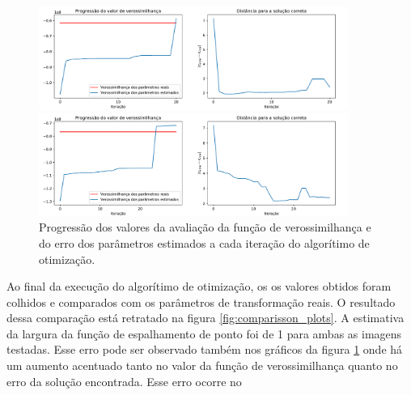 \begin{figure}[H]
	\centering
	\caption{Progressão dos valores da avaliação da função de verossimilhança e do erro dos parâmetros estimados a cada iteração do algorítimo de otimização.}
	\label{fig:progression_plots}
	\begin{minipage}[b]{.99\linewidth}
		\centering
		\includegraphics[width=0.90\textwidth]{./figures/results_figures/progression_plot.pdf}
	\end{minipage}

	\begin{minipage}[b]{.99\linewidth}
		\centering
		\includegraphics[width=0.90\textwidth]{./figures/results_figures/progression_plot2.pdf}
	\end{minipage}
\end{figure}

Ao final da execução do algorítimo de otimização, os os valores obtidos foram
colhidos e comparados com os parâmetros de transformação reais. O resultado dessa
comparação está retratado na figura \ref{fig:comparisson_plots}. 
A estimativa da largura da função de espalhamento de ponto foi de 1 para ambas as imagens testadas.
Esse erro pode ser observado também nos gráficos da figura \ref{fig:progression_plots} onde há um aumento acentuado tanto no valor da função de verossimilhança quanto no erro da solução encontrada.
Esse erro ocorre no 



